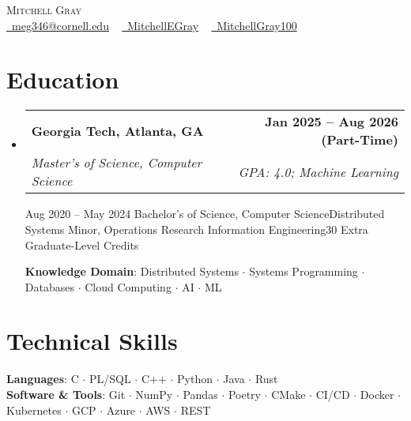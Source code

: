 \documentclass[letterpaper,11pt]{article}
\makeatletter
\newcommand{\resumeSpecialSubheadingCornell}[6]{
  \vspace{-2pt}\item
    \begin{tabular*}{1.0\textwidth}[t]{l@{\extracolsep{\fill}}r}
      \textbf{#1} & \textbf{\small #2} \\
      \textit{\small#3} & \textit{\small #4} \\
      \textit{\small#5} & \textit{\small #6} \\
    \end{tabular*}\vspace{-7pt}
}
\newcommand{\resumeSpecialSubheadingGT}[6]{
  \vspace{-2pt}\item
    \begin{tabular*}{1.0\textwidth}[t]{l@{\extracolsep{\fill}}r}
      \textbf{#1} & \textbf{\small #2} \\
      \textit{\small#3} & \textit{\small #4} \\
    \end{tabular*}\vspace{-7pt}
}
\newcommand{\resumeSubHeadingListStart}{\begin{itemize}[leftmargin=0.0in, label={}]}
\newcommand{\resumeSubHeadingListEnd}{\end{itemize}}
\makeatother
\begin{document}
\begin{center}
    {\Huge \scshape Mitchell Gray} \\ \vspace{1pt}
    \small
    \href{mailto:meg346@cornell.edu}{\faEnvelope\ meg346@cornell.edu} ~ 
    \href{https://www.linkedin.com/in/mitchellegray/}{\faLinkedin\ MitchellEGray}  ~
    \href{https://github.com/MitchellGray100}{\faGithub\ MitchellGray100}
    \vspace{-8pt}
\end{center}


\section{\textcolor{customred}{Education}}
  \resumeSubHeadingListStart
    \resumeSpecialSubheadingGT
      {Georgia Tech, Atlanta, GA}{Jan 2025 -- Aug 2026 (Part-Time)}
      {Master's of Science, Computer Science}{GPA: 4.0; Machine Learning}%


    \resumeSpecialSubheadingCornell
      {Cornell University, Ithaca, NY}{Aug 2020 -- May 2024}
      {Bachelor's of Science, Computer Science}{Distributed Systems}%
      {Minor, Operations Research Information Engineering}{30 Extra Graduate-Level Credits}

      \vspace{2pt}
      \textbf{Knowledge Domain}: Distributed Systems $\cdot$ Systems Programming $\cdot$ Databases $\cdot$ Cloud Computing 
      $\cdot$ AI $\cdot$ ML
      
    \resumeSubHeadingListEnd
\vspace{-18pt}

\section{\textcolor{customred}{Technical Skills}}
 \begin{itemize}[leftmargin=0.1in, label={}]
    \small{\item{
     \textbf{Languages}{: C $\cdot$ PL/SQL $\cdot$ C++ $\cdot$ Python $\cdot$ Java $\cdot$ Rust} \\
     \textbf{Software \& Tools}{: 
     Git $\cdot$ NumPy $\cdot$ Pandas $\cdot$ Poetry $\cdot$ CMake $\cdot$ CI/CD $\cdot$ Docker $\cdot$ Kubernetes $\cdot$ GCP $\cdot$ Azure $\cdot$ AWS $\cdot$ REST
     }\\
    }}
 \end{itemize}
 \vspace{-20pt}
\end{document}
